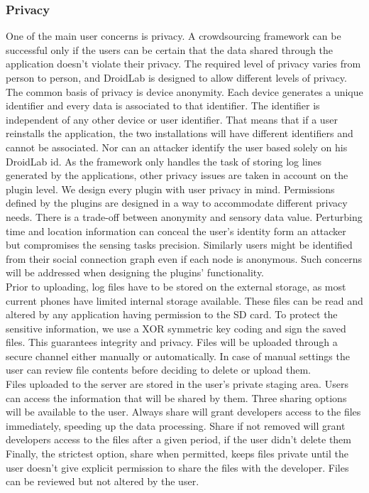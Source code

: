 \documentclass[conference,letterpaper]{IEEEtran}
\begin{document}
\subsubsection{Privacy}
One of the main user concerns is privacy. A crowdsourcing framework can be successful only if the users can be certain that the data shared through the application doesn't violate their privacy. The required level of privacy varies from person to person, and DroidLab is designed to allow different levels of privacy.\\
\indent The common basis of privacy is device anonymity. Each device generates a unique identifier and every data is associated to that identifier. The identifier is independent of any other device or user identifier. That means that if a user reinstalls the application, the two installations will have different identifiers and cannot be associated. Nor can an attacker identify the user based solely on his DroidLab id. As the framework only handles the task of storing log lines generated by the applications, other privacy issues are taken in account on the plugin level. We design every plugin with user privacy in mind. Permissions defined by the plugins are designed in a way to accommodate different privacy needs. There is a trade-off between anonymity and sensory data value. Perturbing time and location information can conceal the user's identity form an attacker but compromises the sensing tasks precision. Similarly users might be identified from their social connection graph even if each node is anonymous. Such concerns will be addressed when designing the plugins' functionality.\\
\indent Prior to uploading, log files have to be stored on the external storage, as most current phones have limited internal storage available. These files can be read and altered by any application having permission to the SD card. To protect the sensitive information, we use a XOR symmetric key coding and sign the saved files. This guarantees integrity and privacy. Files will be uploaded through a secure channel either manually or automatically. In case of manual settings the user can review file contents before deciding to delete or upload them.\\
\indent Files uploaded to the server are stored in the user's private staging area. Users can access the information that will be shared by them. Three sharing options will be available to the user. Always share will grant developers access to the files immediately, speeding up the data processing. Share if not removed will grant developers access to the files after a given period, if the user didn't delete them Finally, the strictest option, share when permitted, keeps files private until the user doesn't give explicit permission to share the files with the developer. Files can be reviewed but not altered by the user.
\end{document}
